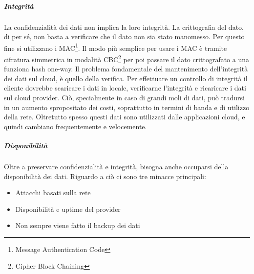 \subparagraph{Integrità}
La confidenzialità dei dati non implica la loro integrità. La crittografia del dato, di per sé, non basta a verificare che il dato non sia stato manomesso.
Per questo fine si utilizzano i MAC\footnote{Message Authentication Code}. Il modo più semplice per usare i MAC è tramite cifratura simmetrica in modalità CBC\footnote{Cipher Block Chaining} per poi passare il dato crittografato a una funziona hash one-way. 
Il problema fondamentale del mantenimento dell'integrità dei dati sul cloud, è quello della verifica.\cite{CloudSecurityBook}
Per effettuare un controllo di integrità il cliente dovrebbe scaricare i dati in locale, verificarne l'integrità e ricaricare i dati sul cloud provider. Ciò, specialmente in caso di grandi moli di dati, può tradursi in un aumento spropositato dei costi, soprattutto in termini di banda e di utilizzo della rete.
Oltretutto spesso questi dati sono utilizzati dalle applicazioni cloud, e quindi cambiano frequentemente e velocemente.\cite{CloudSecurityBook}

\subparagraph{Disponibilità}
Oltre a preservare confidenzialità e integrità, bisogna anche occuparsi della disponibilità dei dati.\cite{CloudSecurityBook}
Riguardo a ciò ci sono tre minacce principali:
\begin{itemize}
\item Attacchi basati sulla rete
\item Disponibilità e uptime del provider
\item Non sempre viene fatto il backup dei dati
\end{itemize}

